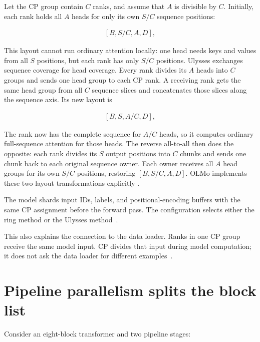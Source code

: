 \documentclass[11pt]{article}
\begin{document}
Let the CP group contain \(C\) ranks, and assume that \(A\) is divisible by
\(C\). Initially, each rank holds all \(A\) heads for only its own \(S/C\)
sequence positions:

\begin{equation}
\begin{split}
[B,S/C,A,D],
\end{split}
\end{equation}

This layout cannot run ordinary attention locally: one head needs keys and
values from all \(S\) positions, but each rank has only \(S/C\) positions.
Ulysses exchanges sequence coverage for head coverage. Every rank divides its
\(A\) heads into \(C\) groups and sends one head group to each CP rank. A
receiving rank gets the same head group from all \(C\) sequence slices and
concatenates those slices along the sequence axis. Its new layout is

\begin{equation}
\begin{split}
[B,S,A/C,D],
\end{split}
\end{equation}

The rank now has the complete sequence for \(A/C\) heads, so it computes
ordinary full-sequence attention for those heads. The reverse all-to-all then
does the opposite: each rank divides its \(S\) output positions into \(C\)
chunks and sends one chunk back to each original sequence owner. Each owner
receives all \(A\) head groups for its own \(S/C\) positions, restoring
\([B,S/C,A,D]\). OLMo implements these two layout transformations explicitly
\cite{olmo-context-parallel}.

The model shards input IDs, labels, and positional-encoding buffers with the
same CP assignment before the forward pass. The configuration selects either
the ring method or the Ulysses method~\cite{olmo-transformer-model,olmo-train-config}.

This also explains the connection to the data loader. Ranks in one CP group
receive the same model input. CP divides that input during model computation;
it does not ask the data loader for different examples~\cite{olmo-world-mesh}.

\newpage
\section{Pipeline parallelism splits the block list}

Consider an eight-block transformer and two pipeline stages:
\end{document}
